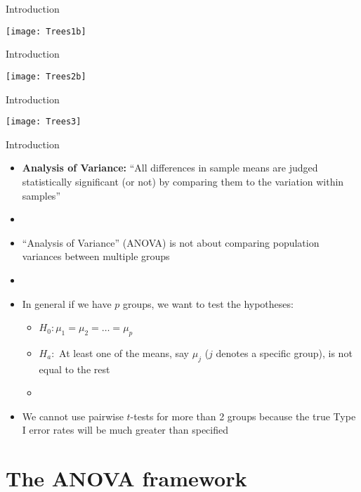 \documentclass[xcolor=dvipsnames]{beamer}
\begin{document}
\begin{frame}{Introduction}
	\begin{center}
		\texttt{[image: Trees1b]}
	\end{center}
\end{frame}

\begin{frame}{Introduction}
	\begin{center}
		\texttt{[image: Trees2b]}
	\end{center}
\end{frame}

\begin{frame}{Introduction}
	\begin{center}
		\texttt{[image: Trees3]}
	\end{center}
\end{frame}

\begin{frame}{Introduction}
	\begin{itemize}
		\item \textbf{Analysis of Variance:} ``All differences in sample means are judged statistically
		significant (or not) by comparing them to the variation within samples'' \pause
		\item[]
		\item ``Analysis of Variance'' (ANOVA) is not about comparing population variances between multiple groups \pause
		\item[]
		\item In general if we have $p$ groups, we want to test the hypotheses: \pause
		\begin{itemize}
			\item $H_0: \mu_1 = \mu_2 = \hdots = \mu_p$ \pause
			\item $H_a: $ At least one of the means, say $\mu_j$ ($j$ denotes a specific group), is not equal to the rest \pause
			\item[]
		\end{itemize}
		\item We cannot use pairwise $t$-tests for more than 2 groups because the true Type I error rates will be much greater than specified
	\end{itemize}
\end{frame}

\section{The ANOVA framework}
\end{document}
